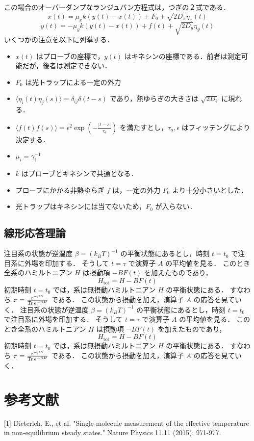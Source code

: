 \documentclass{jsarticle}
\numberwithin{equation}{section}
\theoremstyle{definition}
\newcommand{\ave}[1]{\langle #1 \rangle}
\begin{document}
この場合のオーバーダンプなランジュバン方程式は，つぎの２式である．
\begin{equation}
  \dot{x}(t) = \mu_x k (y(t) - x(t)) + F_0 + \sqrt{2D_x} \eta_x (t)
\end{equation}
\begin{equation}
  \dot{y}(t) = - \mu_y k (y(t) - x(t)) + f(t) + \sqrt{2D_y} \eta_y (t)
\end{equation}
いくつかの注意を以下に列挙する．
\begin{itemize}
  \item $x(t)$ はプローブの座標で，$y(t)$ はキネシンの座標である．前者は測定可能だが，後者は測定できない．
  \item $F_0$ は光トラップによる一定の外力
  \item $\ave{\eta_i (t) \eta_j (s)} = \delta_{ij} \delta (t-s)$ であり，熱ゆらぎの大きさは $\sqrt{2D_i}$ に現れる．
  \item $\ave{f(t) f(s)} = \epsilon^2 \exp( - \frac{|t-s|}{\tau_a} )$ を満たすとし，$\tau_a, \epsilon$ はフィッテングにより決定する．
  \item $\mu_i = \gamma_i^{-1}$
  \item $k$ はプローブとキネシンで共通となる．
  \item プローブにかかる非熱ゆらぎ $f$ は，一定の外力 $F_0$ より十分小さいとした．
  \item 光トラップはキネシンには当てないため，$F_0$ が入らない．
\end{itemize}

\subsection{線形応答理論}
注目系の状態が逆温度 $\beta = (k_B T)^{-1}$ の平衡状態にあるとし，時刻 $t = t_0$ で注目系に外場を印加する．
そうして $t = \tau $ で演算子 $A$ の平均値を見る．
このとき全系のハミルトニアン $H$ は摂動項 $-BF(t)$ を加えたものであり，
\begin{equation}
  H_{\text{tot}} = H - BF(t)
\end{equation}
初期時刻 $t = t_0$ では，系は無摂動ハミルトニアン $H$ の平衡状態にある．
すなわち $\mathbf{\pi } = \frac{e^{-\beta H}}{\Tr e^{-\beta H}}$ である．
この状態から摂動を加え，演算子 $A$ の応答を見ていく．
注目系の状態が逆温度 $\beta = (k_B T)^{-1}$ の平衡状態にあるとし，時刻 $t = t_0$ で注目系に外場を印加する．
そうして $t = \tau $ で演算子 $A$ の平均値を見る．
このとき全系のハミルトニアン $H$ は摂動項 $-BF(t)$ を加えたものであり，
\begin{equation}
  H_{\text{tot}} = H - BF(t)
\end{equation}
初期時刻 $t = t_0$ では，系は無摂動ハミルトニアン $H$ の平衡状態にある．
すなわち $\mathbf{\pi } = \frac{e^{-\beta H}}{\Tr e^{-\beta H}}$ である．
この状態から摂動を加え，演算子 $A$ の応答を見ていく．


\newpage 
\section{参考文献}
[1] Dieterich, E., et al. "Single-molecule measurement of the effective temperature in non-equilibrium steady states." Nature Physics 11.11 (2015): 971-977.
\end{document}
